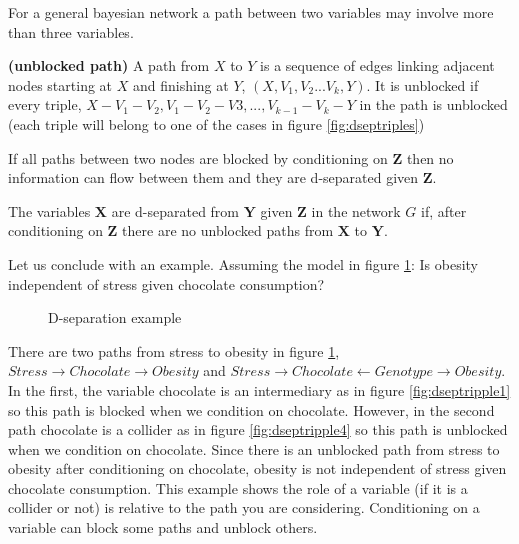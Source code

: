 \documentclass[11pt,a4paper]{article}
\begin{document}
For a general bayesian network a path between two variables may involve more than three variables. 

\begin{definition}
\textbf{(unblocked path)} A path from $X$ to $Y$ is a sequence of edges linking adjacent nodes starting at $X$ and finishing at $Y$,  $(X,V_{1},V_{2}...V_{k},Y)$. It is unblocked if every triple, $X-V_{1}-V_{2},V_{1}-V_{2}-V{3},...,V_{k-1}-V_{k}-Y$ in the path is unblocked (each triple will belong to one of the cases in figure \ref{fig:dseptriples})
\end{definition}

If all paths between two nodes are blocked by conditioning on $\boldsymbol{Z}$ then no information can flow between them and they are d-separated given $\boldsymbol{Z}$. 

\begin{definition}
The variables $\boldsymbol{X}$ are d-separated from $\boldsymbol{Y}$ given $\boldsymbol{Z}$ in the network $G$ if, after conditioning on $\boldsymbol{Z}$ there are no unblocked paths from $\boldsymbol{X}$ to $\boldsymbol{Y}$.  
\end{definition}

Let us conclude with an example. Assuming the model in figure \ref{fig:chocindepstress}: Is obesity independent of stress given chocolate consumption?
\begin{figure}[h]
\centering
\caption{D-separation example}
\label{fig:chocindepstress}
\end{figure}

There are two paths from stress to obesity in figure \ref{fig:chocindepstress}, $Stress \rightarrow Chocolate \rightarrow Obesity$ and $Stress \rightarrow Chocolate \leftarrow Genotype \rightarrow Obesity$. In the first, the variable chocolate is an intermediary as in figure \ref{fig:dseptripple1} so this path is blocked when we condition on chocolate. However, in the second path chocolate is a collider as in figure \ref{fig:dseptripple4} so this path is unblocked when we condition on chocolate. Since there is an unblocked path from stress to obesity after conditioning on chocolate, obesity is not independent of stress given chocolate consumption. This example shows the role of a variable (if it is a collider or not) is relative to the path you are considering. Conditioning on a variable can block some paths and unblock others.
\end{document}
